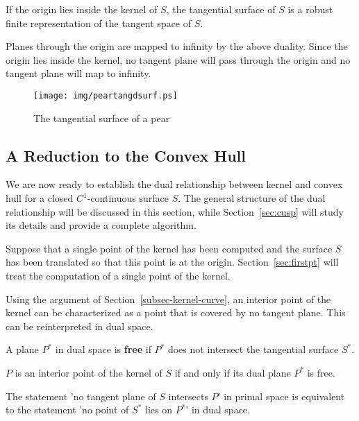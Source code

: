 \documentclass{elsart}
\begin{document}
\begin{lemma}
\label{lem:drobust}
If the origin lies inside the kernel of $S$,
the tangential surface of $S$ is a robust finite representation of
the tangent space of $S$.
\end{lemma}
\prf
Planes through the origin are mapped to infinity by the above duality.
Since the origin lies inside the kernel,
no tangent plane will pass through the origin and no tangent plane will map to infinity.
\QED

\begin{figure}
\begin{center}
\texttt{[image: img/peartangdsurf.ps]}
\end{center}
\caption{The tangential surface of a pear}
\label{fig:peartangdsurf}
\vskip 0.2in
\end{figure}


\subsection{A Reduction to the Convex Hull}
\label{sec:reduction}

We are now ready to establish the dual relationship between kernel and convex hull
for a closed $C^1$-continuous surface $S$.
The general structure of the dual relationship will be discussed in this section,
while Section~\ref{sec:cusp} will study its details and provide a complete algorithm.

Suppose that a single point of the kernel has been computed and the surface $S$
has been translated so that this point is at the origin.
Section~\ref{sec:firstpt} will treat the computation of a single point of the kernel.

Using the argument of Section~\ref{subsec-kernel-curve},
an interior point of the kernel can be characterized as a point that is covered by
no tangent plane.
This can be reinterpreted in dual space.

\begin{defn2}
A plane $P^*$ in dual space is {\bf free} if $P^*$ does not intersect the tangential surface $S^*$.
\end{defn2}

\begin{lemma}
\label{lem:dualkernelchar}
$P$ is an interior point of the kernel of $S$ if and only if 
its dual plane $P^*$ is free.
\end{lemma}
\prf
The statement 'no tangent plane of $S$ intersects $P$' in primal space
is equivalent to the statement 'no point of $S^*$ lies on $P^*$' in dual space.
\QED
\end{document}
